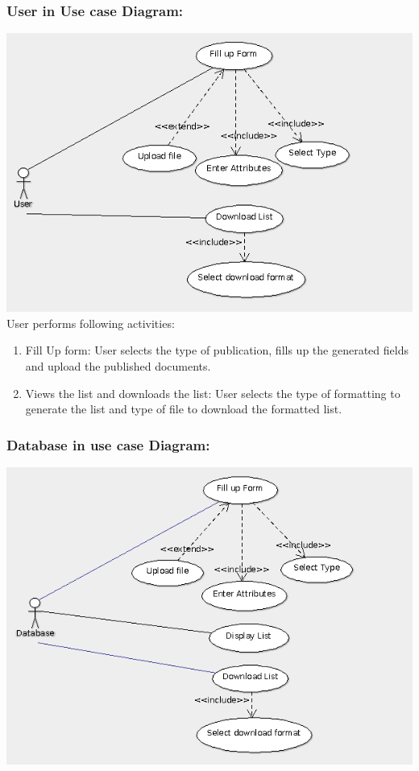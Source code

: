 \documentclass[12pt]{extarticle}
\begin{document}
		\subsubsection{User in Use case Diagram:}
		\includegraphics[scale=0.7]{User_in_UCD}\\
		User performs following activities:
		
		\begin{enumerate}
			\item Fill Up form: User selects the type of publication, fills up the generated fields and upload the published documents.
			\item Views the list and downloads the list: User selects the type of formatting to generate the list and type of file to download the formatted list.
			
			
			
		\end{enumerate}
		\subsubsection{Database in use case Diagram:}
		\includegraphics[scale=0.7]{Database_in_UCD}
		\\
		
\end{document}
